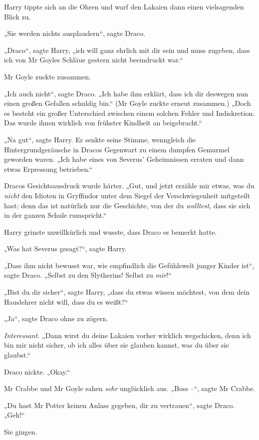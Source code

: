 {Harry tippte sich an die Ohren und warf den Lakaien dann einen vielsagenden Blick zu.

„Sie werden nichts ausplaudern“, sagte Draco.

„Draco“, sagte Harry, „ich will ganz ehrlich mit dir sein und muss zugeben, dass ich von Mr Goyles Schläue gestern nicht beeindruckt war.“

Mr Goyle zuckte zusammen.

„Ich auch nicht“, sagte Draco. „Ich habe ihm erklärt, dass ich dir deswegen nun einen großen Gefallen schuldig bin.“ (Mr Goyle zuckte erneut zusammen.) „Doch es besteht ein großer Unterschied zwischen einem solchen Fehler und Indiskretion. Das wurde ihnen wirklich von frühster Kindheit an beigebracht.“

„Na gut“, sagte Harry. Er senkte seine Stimme, wenngleich die Hintergrundgeräusche in Dracos Gegenwart zu einem dumpfen Gemurmel geworden waren. „Ich habe eines von Severus' Geheimnissen erraten und dann etwas Erpressung betrieben.“

Dracos Gesichtsausdruck wurde härter. „Gut, und jetzt erzähle mir etwas, was du \emph{nicht} den Idioten in Gryffindor unter dem Siegel der Verschwiegenheit mitgeteilt hast; denn das ist natürlich nur die Geschichte, von der du \emph{wolltest}, dass sie sich in der ganzen Schule rumspricht.“

Harry grinste unwillkürlich und wusste, dass Draco es bemerkt hatte.

„Was hat Severus gesagt?“, sagte Harry.

„Dass ihm nicht bewusst war, wie empfindlich die Gefühlswelt junger Kinder ist“, sagte Draco. „Selbst zu den Slytherins! Selbst zu \emph{mir}!“

„Bist du dir sicher“, sagte Harry, „dass du etwas wissen möchtest, von dem dein Hauslehrer nicht will, dass du es weißt?“

„Ja“, sagte Draco ohne zu zögern.

\emph{Interessant.} „Dann wirst du deine Lakaien vorher wirklich wegschicken, denn ich bin mir nicht sicher, ob ich alles über sie glauben kannst, was du über sie glaubst.“

Draco nickte. „Okay.“

Mr Crabbe und Mr Goyle sahen \emph{sehr} unglücklich aus. „Boss --“, sagte Mr Crabbe.

„Du hast Mr Potter keinen Anlass gegeben, dir zu vertrauen“, sagte Draco. „Geh!“

Sie gingen.

}
